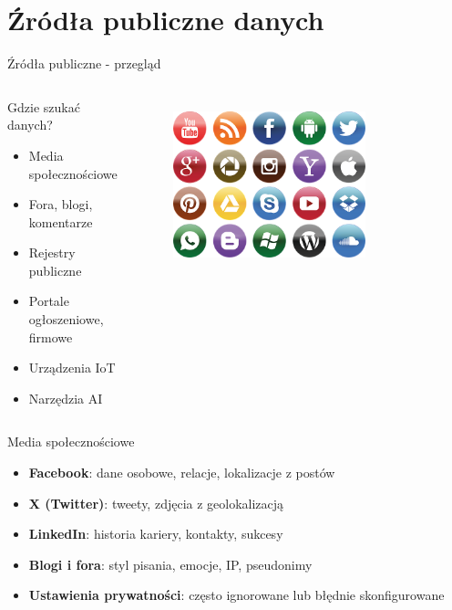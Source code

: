 \section{Źródła publiczne danych}

\begin{frame}{Źródła publiczne - przegląd}
\begin{columns}[c]
    \begin{alertblock}{Gdzie szukać danych?}
        \begin{itemize}
          \item Media społecznościowe \cite{zrodlo} \cite{zrodloArtykul}
          \item Fora, blogi, komentarze
          \item Rejestry publiczne \cite{zrodloDzialalnosc}
          \item Portale ogłoszeniowe, firmowe
          \item Urządzenia IoT \cite{zrodlo2}
          \item Narzędzia AI \cite{ai}
        \end{itemize}
        \end{alertblock}
    \centering
    \begin{figure}
        \centering
        \includegraphics[width=0.75\textwidth]{images/socialMedia.png}
        \label{fig:socialMedia}
    \end{figure}    
\end{columns}
\end{frame}

\begin{frame}{Media społecznościowe}
\begin{block}{}
\begin{itemize}
  \item \textbf{Facebook}: dane osobowe, relacje, lokalizacje z postów
  \item \textbf{X (Twitter)}: tweety, zdjęcia z geolokalizacją
  \item \textbf{LinkedIn}: historia kariery, kontakty, sukcesy
  \item \textbf{Blogi i fora}: styl pisania, emocje, IP, pseudonimy
  \item \textbf{Ustawienia prywatności}: często ignorowane lub błędnie skonfigurowane \cite{zrodlo} \cite{zrodloArtykul}
\end{itemize}
\end{block}
\end{frame}

